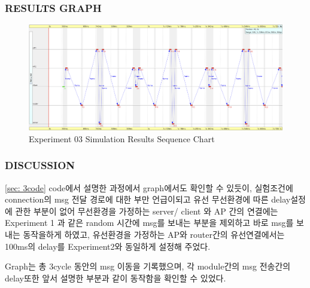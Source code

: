         \subsubsection{RESULTS GRAPH}
            \vspace{-4mm}
            \begin{figure}[!h]\centering 
            	\includegraphics[width=.99\textwidth]{image/week10/3-2.png}
            	\caption{\footnotesize
            	Experiment 03 Simulation Results Sequence Chart}
            	\vspace{-10pt}
            \end{figure}
            \vspace{-4mm}
        \subsubsection{DISCUSSION}
        \ref{sec: 3code} code에서 설명한 과정에서 graph에서도 확인할 수 있듯이, 실험조건에 connection의 msg 전달 경로에 대한 부만 언급이되고 유선 무선환경에 따른 delay설정에 관한 부분이 없어 무선환경을 가정하는 server/ client 와 AP 간의 연결에는 Experiment 1 과 같은 random 시간에 msg를 보내는 부분을 제외하고 바로 msg를 보내는 동작을하게 하였고, 유선환경을 가정하는 AP와 router간의 유선연결에서는 100ms의 delay를 Experiment2와 동일하게 설정해 주었다. 
        
        Graph는 총 3cycle 동안의 msg 이동을 기록했으며, 각 module간의 msg 전송간의 delay또한 앞서 설명한 부분과 같이 동작함을 확인할 수 있었다. 
        
        